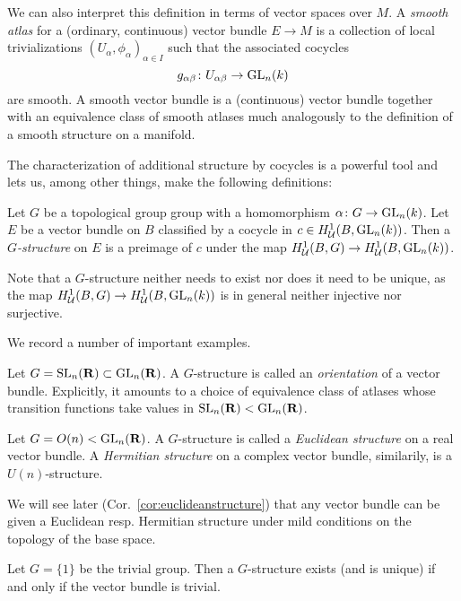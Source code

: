 \documentclass[a4paper,openany]{scrbook}
\DeclareMathOperator{\SL}{SL}
\begin{document}
We can also interpret this definition in terms of vector spaces over $M$. A \emph{smooth atlas} for a (ordinary, continuous) vector bundle $E \to M$ is a collection of local trivializations $(U_\alpha,\phi_\alpha)_{\alpha \in I}$ such that the associated cocycles
\[
g_{\alpha\beta}\colon U_{\alpha\beta} \to \operatorname{GL}_n(k)
\]
are smooth. A smooth vector bundle is a (continuous) vector bundle together with an equivalence class of smooth atlases much analogously to the definition of a smooth structure on a manifold.

The characterization of additional structure by cocycles is a powerful tool and lets us, among other things, make the following definitions:

\begin{defn}
Let $G$ be a topological group group with a homomorphism $\alpha\colon G \to \operatorname{GL}_n(k)$. Let $E$ be a vector bundle on $B$ classified by a cocycle in $c \in H^1_{\mathcal U}(B,\operatorname{GL}_n(k))$. Then a \emph{$G$-structure} on $E$ is a preimage of $c$ under the map $H^1_{\mathcal U}(B,G) \to H^1_{\mathcal U}(B,\operatorname{GL}_n(k))$.
\end{defn}

Note that a $G$-structure neither needs to exist nor does it need to be unique, as the map $H^1_{\mathcal U}(B,G) \to H^1_{\mathcal U}(B,\operatorname{GL}_n(k))$ is in general neither injective nor surjective.

We record a number of important examples.

\begin{example}
Let $G = \SL_n(\R) \subset \GL_n(\R)$. A $G$-structure is called an \emph{orientation} of a vector bundle. Explicitly, it amounts to a choice of equivalence class of atlases whose transition functions take values in $\SL_n(\R) < \GL_n(\R)$.
\end{example}

\begin{example}
Let $G = O(n) < \operatorname{GL}_n(\mathbf R)$. A $G$-structure is called a \emph{Euclidean structure} on a real vector bundle. A \emph{Hermitian structure} on a complex vector bundle, similarily, is a $U(n)$-structure.
\end{example}

We will see later (Cor.~\ref{cor:euclideanstructure}) that any vector bundle can be given a Euclidean resp. Hermitian structure under mild conditions on the topology of the base space.

\begin{example}
Let $G = \{1\}$ be the trivial group. Then a $G$-structure exists (and is unique) if and only if the vector bundle is trivial.
\end{example}
\end{document}
